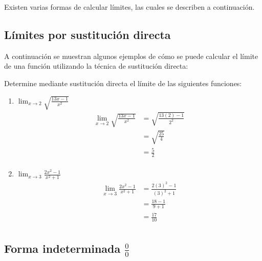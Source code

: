 Existen varias formas de calcular límites, las cuales se describen a continuación.

\subsection{Límites por sustitución directa}

A continuación se muestran algunos ejemplos de cómo se puede calcular el límite de una función 
utilizando la técnica de sustitución directa:

\ex{} {
    Determine mediante sustitución directa el límite de las siguientes funciones: \\

    \begin{enumerate}
        \item $\lim_{x \to 2} \sqrt{\frac{13x-1}{x^2}}$ \\
            \begin{align*}
                \lim_{x \to 2} \sqrt{\frac{13x-1}{x^2}} &= \sqrt{\frac{13(2)-1}{2^2}} \\
                &= \sqrt{\frac{25}{4}} \\
                &= \frac{5}{2} \\
            \end{align*}
        \item $\lim_{x \to 3} \frac{2x^2-1}{x^2+1}$ \\
            \begin{align*}
                \lim_{x \to 3} \frac{2x^2-1}{x^2+1} &= \frac{2(3)^2-1}{(3)^2+1} \\
                &= \frac{18-1}{9+1} \\
                &= \frac{17}{10} \\
            \end{align*}
    \end{enumerate}
}

\subsection{Forma indeterminada $\frac{0}{0}$}
